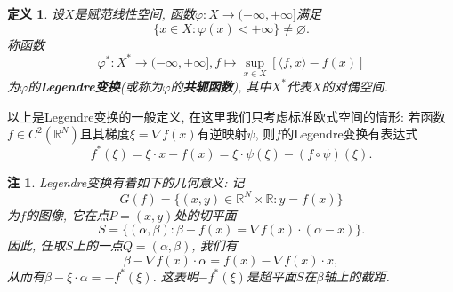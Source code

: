 \documentclass[12pt,a4paper]{article}
\newtheorem{definition}[theorem]{定义}
\newtheorem{remark}[theorem]{注}
\begin{document}
\begin{definition}
    设$X$是赋范线性空间, 函数$\varphi\colon X \rightarrow (-\infty, +\infty]$满足
    \begin{equation*}
        \{x \in X\colon \varphi(x) < +\infty\} \neq \varnothing.
    \end{equation*}
    称函数 
    \begin{equation*}
        \boxed{\varphi^*\colon X^* \rightarrow (-\infty, +\infty], f \mapsto \sup_{x \in X}[\langle f, x\rangle - f(x)]}
    \end{equation*}
    为$\varphi$的\textbf{Legendre变换}(或称为$\varphi$的\textbf{共轭函数}), 其中$X^*$代表$X$的对偶空间.
\end{definition}

以上是Legendre变换的一般定义, 在这里我们只考虑标准欧式空间的情形: 若函数$f \in C^2(\mathbb{R}^N)$且其梯度$\xi = \nabla f(x)$有逆映射$\psi$, 则$f$的Legendre变换有表达式 
\begin{equation*}
    \boxed{f^*(\xi) = \xi \cdot x - f(x)= \xi \cdot \psi(\xi) - (f \circ \psi)(\xi).} 
\end{equation*}

\begin{remark}
    Legendre变换有着如下的几何意义: 记 
    \begin{equation*}
        G(f) = \{(x, y) \in \mathbb{R}^N \times \mathbb{R}\colon y = f(x)\}
    \end{equation*}
    为$f$的图像, 它在点$P = (x, y)$处的切平面
    \begin{equation*}
        S = \{(\alpha, \beta)\colon \beta - f(x) = \nabla f(x) \cdot (\alpha - x)\}. 
    \end{equation*}
    因此, 任取$S$上的一点$Q = (\alpha, \beta)$, 我们有 
    \begin{equation*}
        \beta - \nabla f(x) \cdot \alpha = f(x) - \nabla f(x) \cdot x,
    \end{equation*}
    从而有$\beta - \xi \cdot \alpha = -f^*(\xi)$. 这表明$-f^*(\xi)$是超平面$S$在$\beta$轴上的截距.
\end{remark}
\end{document}
